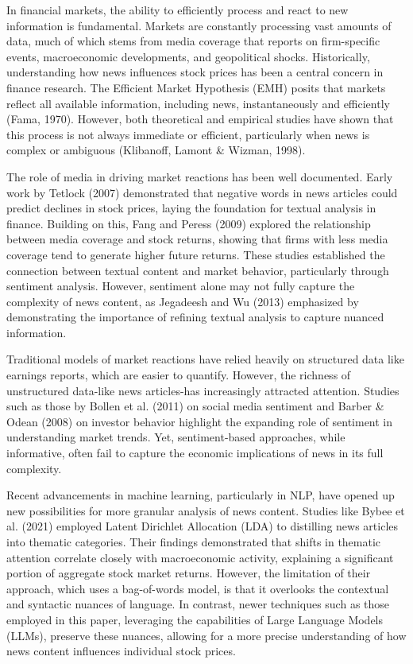 
In financial markets, the ability to efficiently process and react to new information is fundamental. Markets are constantly processing vast amounts of data, much of which stems from media coverage that reports on firm-specific events, macroeconomic developments, and geopolitical shocks. Historically, understanding how news influences stock prices has been a central concern in finance research. The Efficient Market Hypothesis (EMH) posits that markets reflect all available information, including news, instantaneously and efficiently (Fama, 1970). However, both theoretical and empirical studies have shown that this process is not always immediate or efficient, particularly when news is complex or ambiguous (Klibanoff, Lamont \& Wizman, 1998).

The role of media in driving market reactions has been well documented. Early work by Tetlock (2007) demonstrated that negative words in news articles could predict declines in stock prices, laying the foundation for textual analysis in finance. Building on this, Fang and Peress (2009) explored the relationship between media coverage and stock returns, showing that firms with less media coverage tend to generate higher future returns. These studies established the connection between textual content and market behavior, particularly through sentiment analysis. However, sentiment alone may not fully capture the complexity of news content, as Jegadeesh and Wu (2013) emphasized by demonstrating the importance of refining textual analysis to capture nuanced information.

Traditional models of market reactions have relied heavily on structured data like earnings reports, which are easier to quantify. However, the richness of unstructured data-like news articles-has increasingly attracted attention. Studies such as those by Bollen et al. (2011) on social media sentiment and Barber & Odean (2008) on investor behavior highlight the expanding role of sentiment in understanding market trends. Yet, sentiment-based approaches, while informative, often fail to capture the economic implications of news in its full complexity.

Recent advancements in machine learning, particularly in NLP, have opened up new possibilities for more granular analysis of news content. Studies like Bybee et al. (2021) employed Latent Dirichlet Allocation (LDA) to distilling news articles into thematic categories. Their findings demonstrated that shifts in thematic attention correlate closely with macroeconomic activity, explaining a significant portion of aggregate stock market returns. However, the limitation of their approach, which uses a bag-of-words model, is that it overlooks the contextual and syntactic nuances of language. In contrast, newer techniques such as those employed in this paper, leveraging the capabilities of Large Language Models (LLMs), preserve these nuances, allowing for a more precise understanding of how news content influences individual stock prices.

